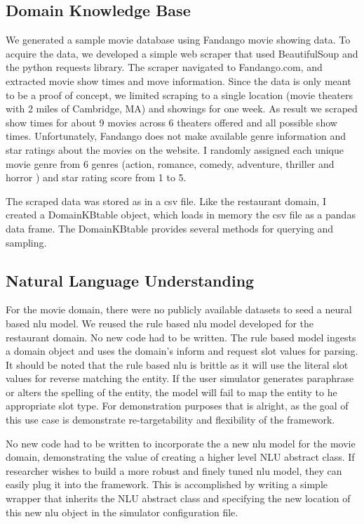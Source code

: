 \subsection{Domain Knowledge Base}

We generated a sample movie database using Fandango movie showing data. To acquire the data, we developed a simple web scraper that used BeautifulSoup and the python requests library. The scraper navigated to Fandango.com, and extracted movie show times and move information. Since the data is only meant to be a proof of concept, we limited scraping to a single location (movie theaters with 2 miles of Cambridge, MA) and showings for one week. As result we scraped show times for about 9 movies across 6 theaters offered and all possible show times. Unfortunately, Fandango does not make available genre information and star ratings about the movies on the website. I randomly assigned each unique movie genre from 6 genres (action, romance, comedy, adventure, thriller and horror ) and star rating score from 1 to 5.

The scraped data was stored as in a csv file. Like the restaurant domain, I created a DomainKBtable object, which loads in memory the csv file as a pandas data frame. The DomainKBtable provides several methods for querying and sampling.

\subsection{ Natural Language Understanding}

For the movie domain, there were no publicly available datasets to seed a neural based nlu model. We reused the rule based nlu model developed for the restaurant domain. No new code had to be written. The rule based model ingests a domain object and uses the domain's inform and request slot values for parsing. It should be noted that the rule based nlu is brittle as it will use the literal slot values for reverse matching the entity. If the user simulator generates paraphrase or alters the spelling of the entity, the model will fail to map the entity to he appropriate slot type. For demonstration purposes that is alright, as the goal of this use case is demonstrate re-targetability and flexibility of the framework.

No new code had to be written to incorporate the a new nlu model for the movie domain, demonstrating the value of creating a higher level NLU abstract class. If researcher wishes to build a more robust and finely tuned nlu model, they can easily plug it into the framework. This is accomplished by writing a simple wrapper that inherits the NLU abstract class and 
 specifying the new location of this new nlu object in the simulator configuration file.

